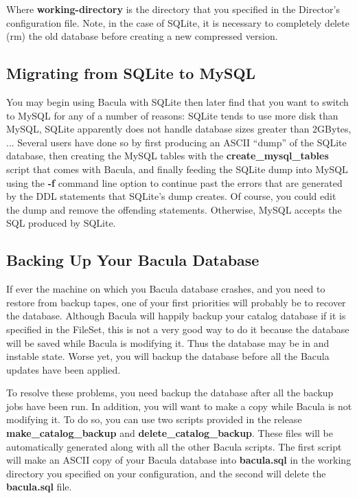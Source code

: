 Where {\bf working-directory} is the directory that you specified in the
Director's configuration file. Note, in the case of SQLite, it is necessary to
completely delete (rm) the old database before creating a new compressed
version. 

\subsection*{Migrating from SQLite to MySQL}

You may begin using Bacula with SQLite then later find that you want to switch
to MySQL for any of a number of reasons: SQLite tends to use more disk than
MySQL, SQLite apparently does not handle database sizes greater than 2GBytes,
... Several users have done so by first producing an ASCII ``dump'' of the
SQLite database, then creating the MySQL tables with the {\bf
create\_mysql\_tables} script that comes with Bacula, and finally feeding the
SQLite dump into MySQL using the {\bf -f} command line option to continue past
the errors that are generated by the DDL statements that SQLite's dump
creates. Of course, you could edit the dump and remove the offending
statements. Otherwise, MySQL accepts the SQL produced by SQLite. 
\label{BackingUpBacula}

\subsection*{Backing Up Your Bacula Database}

If ever the machine on which you Bacula database crashes, and you need to
restore from backup tapes, one of your first priorities will probably be to
recover the database. Although Bacula will happily backup your catalog
database if it is specified in the FileSet, this is not a very good way to do
it because the database will be saved while Bacula is modifying it. Thus the
database may be in and instable state. Worse yet, you will backup the database
before all the Bacula updates have been applied. 

To resolve these problems, you need backup the database after all the backup
jobs have been run. In addition, you will want to make a copy while Bacula is
not modifying it. To do so, you can use two scripts provided in the release
{\bf make\_catalog\_backup} and {\bf delete\_catalog\_backup}. These files
will be automatically generated along with all the other Bacula scripts. The
first script will make an ASCII copy of your Bacula database into {\bf
bacula.sql} in the working directory you specified on your configuration, and
the second will delete the {\bf bacula.sql} file. 

